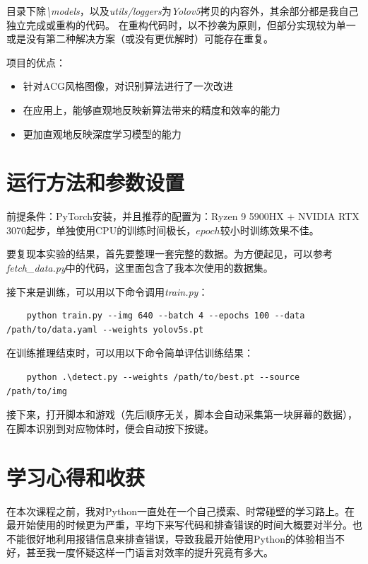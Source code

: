\documentclass[a4paper]{ltxdoc}
\begin{document}
目录下除\textit{\backslash models}，以及\textit{utils/loggers}为\textit{Yolov5}拷贝的内容外，其余部分都是我自己独立完成或重构的代码。
在重构代码时，以不抄袭为原则，但部分实现较为单一或是没有第二种解决方案（或没有更优解时）可能存在重复。

项目的优点：

\begin{itemize}
    \item 针对ACG风格图像，对识别算法进行了一次改进
    \item 在应用上，能够直观地反映新算法带来的精度和效率的能力
    \item 更加直观地反映深度学习模型的能力
\end{itemize}

\section{运行方法和参数设置}

前提条件：PyTorch安装，并且推荐的配置为：Ryzen 9 5900HX + NVIDIA RTX 3070起步，单独使用CPU的训练时间极长，$epoch$较小时训练效果不佳。

要复现本实验的结果，首先要整理一套完整的数据。为方便起见，可以参考\textit{fetch\_data.py}中的代码，这里面包含了我本次使用的数据集。

接下来是训练，可以用以下命令调用\textit{train.py}：

\begin{lstlisting}
    python train.py --img 640 --batch 4 --epochs 100 --data /path/to/data.yaml --weights yolov5s.pt
\end{lstlisting}

在训练推理结束时，可以用以下命令简单评估训练结果：

\begin{lstlisting}
    python .\detect.py --weights /path/to/best.pt --source /path/to/img
\end{lstlisting}

接下来，打开脚本和游戏（先后顺序无关，脚本会自动采集第一块屏幕的数据），在脚本识别到对应物体时，便会自动按下按键。

\section{学习心得和收获}

在本次课程之前，我对Python一直处在一个自己摸索、时常碰壁的学习路上。在最开始使用的时候更为严重，平均下来写代码和排查错误的时间大概要对半分。也不能很好地利用报错信息来排查错误，导致我最开始使用Python的体验相当不好，甚至我一度怀疑这样一门语言对效率的提升究竟有多大。
\end{document}
